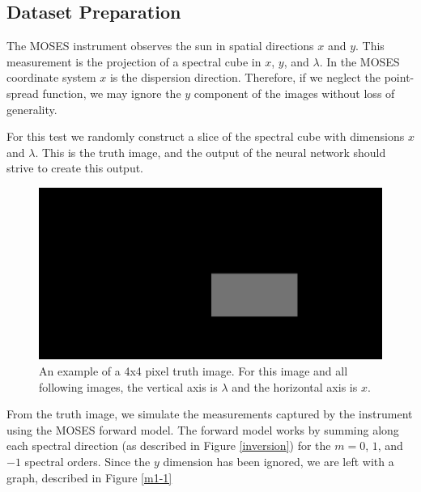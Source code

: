 \documentclass[twoside]{article}
\begin{document}
\begin{multicols}{2}
\subsection{Dataset Preparation}
The MOSES instrument observes the sun in spatial directions $x$ and $y$. This measurement is the projection of a spectral cube in $x$, $y$, and $\lambda$. In the MOSES coordinate system $x$ is the dispersion direction. Therefore, if we neglect the point-spread function, we may ignore the $y$ component of the images without loss of generality. \par For this test we randomly construct a slice of the spectral cube with dimensions $x$ and $\lambda$. This is the truth image, and the output of the neural network should strive to create this output. 
\begin{figure}[H]  
	\centering
	 \includegraphics[width=0.75\linewidth]{images/mIn}
	 \caption{An example of a 4x4 pixel truth image. For this image and all following images, the vertical axis is $\lambda$ and the horizontal axis is $x$.}
	 \label{mIn}
\end{figure}
From the truth image, we simulate the measurements captured by the instrument using the MOSES forward model. The forward model works by summing along each spectral direction (as described in Figure \ref{inversion}) for the $m=0$, $1$, and $-1$ spectral orders. Since the $y$ dimension has been ignored, we are left with a graph, described in Figure \ref{m1-1}
 

\end{multicols}
\end{document}
